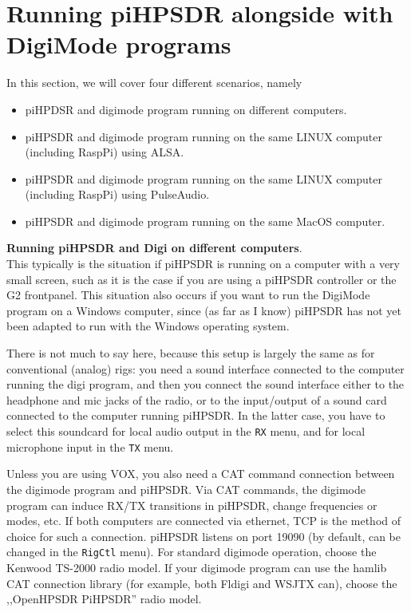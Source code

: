 \documentclass[12pt]{book}
\def\bltt#1{\texttt{\color{blue}#1}}
\begin{document}
\chapter[piHPSDR and digimode programs]{Running piHPSDR alongside with DigiMode programs}

In this section, we will cover four different scenarios, namely
\begin{itemize}
\item{piHPDSR and digimode program running on different computers.}
\item{piHPSDR and digimode program running on the same LINUX computer 
(including RaspPi) using ALSA.}
\item{piHPSDR and digimode program running on the same LINUX computer
(including RaspPi) using PulseAudio.}
\item{piHPSDR and digimode program running on the same MacOS computer.}
\end{itemize}

\textbf{\color{red}Running piHPSDR and Digi on different computers}. \\
This typically is the situation if piHPSDR is running on a computer with a very small
screen, such as it is the case if you are using a piHPSDR controller or the G2 frontpanel.
This situation also occurs if you want to run the DigiMode program on a Windows computer,
since (as far as I know) piHPSDR has not yet been adapted to run with the Windows operating
system.

There is not much to say here, because this setup is largely the same as for conventional
(analog) rigs: you need a sound interface connected to the computer running the digi program,
and then you connect the sound interface either to the headphone and mic jacks of the radio,
or to the input/output of a sound card connected to the computer running piHPSDR. In the
latter case, you have to select this soundcard for local audio output in the \bltt{RX} menu,
and for local microphone input in the \bltt{TX} menu.

Unless you are using VOX, you also need a CAT command connection between the digimode program
and piHPSDR. Via CAT commands, the digimode program can induce RX/TX transitions in piHPSDR,
change frequencies or modes, etc. If both computers are connected via ethernet,
TCP is the method of choice for such a connection. piHPSDR listens on port 19090 (by default,
can be changed in the \bltt{RigCtl} menu). For standard digimode operation, choose the
Kenwood TS-2000 radio model. If your digimode program can use the hamlib CAT connection
library (for example, both Fldigi and WSJTX can), choose the ,,OpenHPSDR PiHPSDR'' radio
model.
\end{document}
